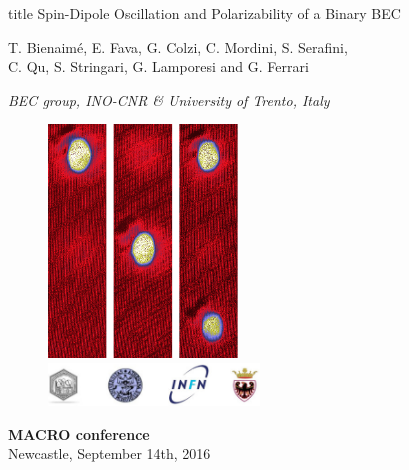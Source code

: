 \begin{frame}[t,plain] 

\begin{minipage}[c][0.6\textheight][c]{\linewidth}
	\begin{beamercolorbox}[wd=\linewidth,colsep*=1em,center,rounded=false]{title}
		{\LARGE Spin-Dipole Oscillation and Polarizability of a Binary BEC}
	\end{beamercolorbox}
	\begin{center}
	T. Bienaimé,  E. Fava, G. Colzi, C. Mordini, S. Serafini, \\
\vspace{0.25em}
C. Qu, S. Stringari, G. Lamporesi and G. Ferrari \\
	\vspace{1em}
	\begin{small}
	\textit{
	BEC group, INO-CNR \& University of Trento, Italy\\
	}
	\end{small}
	\end{center}
\end{minipage}

\vspace{-0.75em}
\begin{minipage}[c][0.35\textheight][c]{\linewidth}
\centering
\begin{figure}
    \centering
    \includegraphics[scale=0.65]{Figures/TitlePicture.pdf} \\
\vspace{0.5em}
	\includegraphics[width=0.5\textwidth]{Figures/Logo_Support.jpg}
\end{figure}

\vspace{-1em}

\begin{small}
\textbf{\textcolor{bellblue}{MACRO conference}}\\
\vspace{0em}
Newcastle, September 14th, 2016
\end{small}

\end{minipage}



\end{frame}

